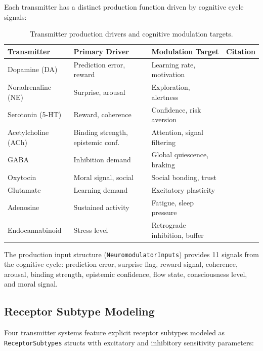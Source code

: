 \documentclass[11pt,a4paper]{article}
\begin{document}
Each transmitter has a distinct production function driven by cognitive cycle signals:

\begin{table}[h]
\centering
\caption{Transmitter production drivers and cognitive modulation targets.}
\label{tab:production}
\begin{tabular}{llll}
\toprule
\textbf{Transmitter} & \textbf{Primary Driver} & \textbf{Modulation Target} & \textbf{Citation} \\
\midrule
Dopamine (DA) & Prediction error, reward & Learning rate, motivation & \citet{schultz1997} \\
Noradrenaline (NE) & Surprise, arousal & Exploration, alertness & \citet{aston-jones2005} \\
Serotonin (5-HT) & Reward, coherence & Confidence, risk aversion & \citet{doya2002} \\
Acetylcholine (ACh) & Binding strength, epistemic conf. & Attention, signal filtering & \citet{hasselmo2006} \\
GABA & Inhibition demand & Global quiescence, braking & \citet{olsen2009} \\
Oxytocin & Moral signal, social & Social bonding, trust & \citet{kosfeld2005} \\
Glutamate & Learning demand & Excitatory plasticity & \citet{olney1969} \\
Adenosine & Sustained activity & Fatigue, sleep pressure & \citet{porkka-heiskanen1997} \\
Endocannabinoid & Stress level & Retrograde inhibition, buffer & \citet{piomelli2003} \\
\bottomrule
\end{tabular}
\end{table}

The production input structure (\texttt{NeuromodulatorInputs}) provides 11 signals from the cognitive cycle: prediction error, surprise flag, reward signal, coherence, arousal, binding strength, epistemic confidence, flow state, consciousness level, and moral signal.

\subsection{Receptor Subtype Modeling}

Four transmitter systems feature explicit receptor subtypes modeled as \texttt{ReceptorSubtypes} structs with excitatory and inhibitory sensitivity parameters:
\end{document}

